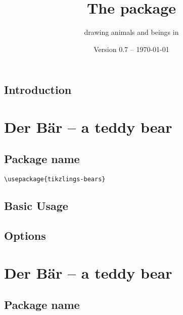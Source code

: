 \documentclass[parskip=half]{scrartcl}
\title{The \texorpdfstring{\tikzlings}{tikzlings} package}
\subtitle{drawing animals and beings in \TikZ}
\author{%
	\texorpdfstring{\texttt{samcarter} (alias 
		\tikzset{external/export=false}%
		\begin{tikzpicture}[scale=0.3,baseline=3pt]
			\duck[body=yellow!50!brown!50!white,
					longhair=red!50!brown, 
					jacket=blue!50!black]
		\end{tikzpicture})\\[0.8em]
		\url{https://github.com/samcarter/tikzlings}
	}{samcarter}}
\date{Version 0.7 -- \today}
\begin{document}
\maketitle
\thispagestyle{scrheadings}

\subsection*{Introduction}
\label{intro}

\section{Der B\"ar -- a teddy bear}

\subsection{Package name}

\begin{tcolorbox}
\vspace*{0.5cm}
\lstinline|\usepackage{tikzlings-bears}|
\vspace*{0.5cm}
\end{tcolorbox}

\subsection{Basic Usage}

\begin{tcblisting}{}
\bear
\end{tcblisting}

\subsection{Options}

\begin{tcblisting}{}
\bear[body=SteelBlue]
\end{tcblisting}

\begin{tcblisting}{}
\bear[3D]
\end{tcblisting}


\section{Der B\"ar -- a teddy bear}

\subsection{Package name}
\end{document}

